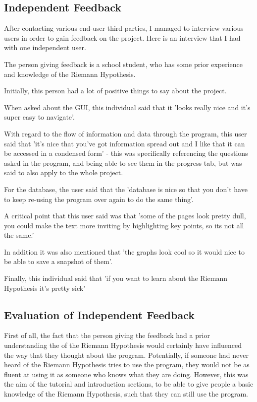 \documentclass[12pt]{article}
\begin{document}
\subsection{Independent Feedback}

After contacting various end-user third parties, I managed to interview various users in order to gain feedback on the project. Here is an interview that I had with one independent user.

The person giving feedback is a school student, who has some prior experience and knowledge of the Riemann Hypothesis.

Initially, this person had a lot of positive things to say about the project.

When asked about the GUI, this individual said that it 'looks really nice and it's super easy to navigate'.

With regard to the flow of information and data through the program, this user said that 'it's nice that you've got information spread out and I like that it can be accessed in a condensed form' - this was specifically referencing the questions asked in the program, and being able to see them in the progress tab, but was said to also apply to the whole project.

For the database, the user said that the 'database is nice so that you don't have to keep re-using the program over again to do the same thing'.

A critical point that this user said was that 'some of the pages look pretty dull, you could make the text more inviting by highlighting key points, so its not all the same.'

In addition it was also mentioned that 'the graphs look cool so it would nice to be able to save a snapshot of them'.

Finally, this individual said that 'if you want to learn about the Riemann Hypothesis it's pretty sick'

\subsection{Evaluation of Independent Feedback}

First of all, the fact that the person giving the feedback had a prior understanding the of the Riemann Hypothesis would certainly have influenced the way that they thought about the program. Potentially, if someone had never heard of the Riemann Hypothesis tries to use the program, they would not be as fluent at using it as someone who knows what they are doing. However, this was the aim of the tutorial and introduction sections, to be able to give people a basic knowledge of the Riemann Hypothesis, such that they can still use the program.
\end{document}
